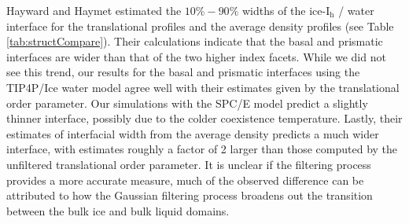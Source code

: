 Hayward and Haymet estimated the $10\%-90\%$ widths of the
ice-I$_\mathrm{h}$ / water interface for the translational profiles
and the average density profiles (see Table
\ref{tab:structCompare}). Their calculations indicate that the basal
and prismatic interfaces are wider than that of the two higher index
facets. While we did not see this trend, our results for the basal and
prismatic interfaces using the TIP4P/Ice water model agree well with
their estimates given by the translational order parameter. Our
simulations with the SPC/E model predict a slightly thinner interface,
possibly due to the colder coexistence temperature. Lastly, their
estimates of interfacial width from the average density predicts a
much wider interface, with estimates roughly a factor of 2 larger than
those computed by the unfiltered translational order parameter. It is
unclear if the filtering process provides a more accurate measure,
much of the observed difference can be attributed to how the Gaussian
filtering process broadens out the transition between the bulk ice and
bulk liquid domains.



